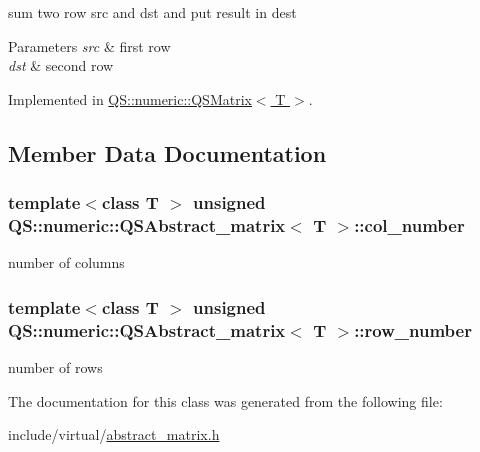 sum two row src and dst and put result in dest 


\begin{DoxyParams}{Parameters}
{\em src} & first row \\
\hline
{\em dst} & second row \\
\hline
\end{DoxyParams}


Implemented in \hyperlink{classQS_1_1numeric_1_1QSMatrix_abf7600e412c6113d936f54f3aae8f566}{Q\-S\-::numeric\-::\-Q\-S\-Matrix$<$ T $>$}.



\subsection{Member Data Documentation}
\hypertarget{classQS_1_1numeric_1_1QSAbstract__matrix_afef7260a628c0c5cbde29acc36cfc1c0}{
\subsubsection[{col\-\_\-number}]{\setlength{\rightskip}{0pt plus 5cm}template$<$class T $>$ unsigned {\bf Q\-S\-::numeric\-::\-Q\-S\-Abstract\-\_\-matrix}$<$ T $>$\-::col\-\_\-number\hspace{0.3cm}{\ttfamily [protected]}}}\label{classQS_1_1numeric_1_1QSAbstract__matrix_afef7260a628c0c5cbde29acc36cfc1c0}


number of columns 

\hypertarget{classQS_1_1numeric_1_1QSAbstract__matrix_afbb3f26fe23a0a4a1e6f728ef0c9f0f0}{
\subsubsection[{row\-\_\-number}]{\setlength{\rightskip}{0pt plus 5cm}template$<$class T $>$ unsigned {\bf Q\-S\-::numeric\-::\-Q\-S\-Abstract\-\_\-matrix}$<$ T $>$\-::row\-\_\-number\hspace{0.3cm}{\ttfamily [protected]}}}\label{classQS_1_1numeric_1_1QSAbstract__matrix_afbb3f26fe23a0a4a1e6f728ef0c9f0f0}


number of rows 



The documentation for this class was generated from the following file\-:\begin{DoxyCompactItemize}
\item 
include/virtual/\hyperlink{abstract__matrix_8h}{abstract\-\_\-matrix.\-h}\end{DoxyCompactItemize}
